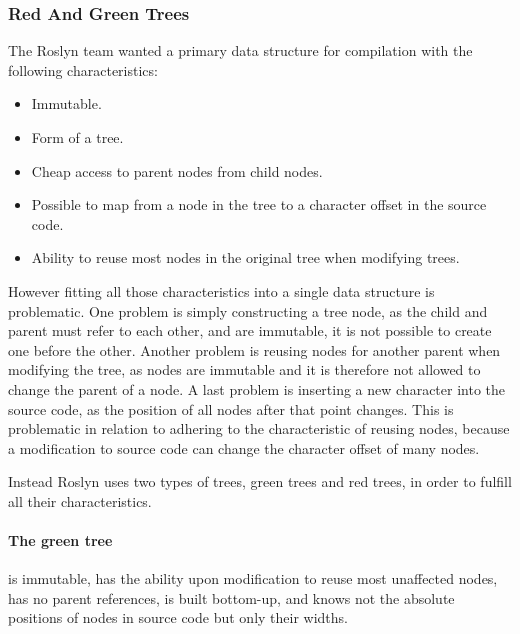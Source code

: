\subsubsection{Red And Green Trees}
The Roslyn team wanted a primary data structure for compilation with the following characteristics\cite{lippert2012redgreen}:
\begin{itemize}
	\item Immutable.
	\item Form of a tree.
	\item Cheap access to parent nodes from child nodes.
	\item Possible to map from a node in the tree to a character offset in the source code.
	\item Ability to reuse most nodes in the original tree when modifying trees.
\end{itemize}
However fitting all those characteristics into a single data structure is problematic\cite{lippert2012redgreen}. One problem is simply constructing a tree node, as the child and parent must refer to each other, and are immutable, it is not possible to create one before the other. Another problem is reusing nodes for another parent when modifying the tree, as nodes are immutable and it is therefore not allowed to change the parent of a node. A last problem is inserting a new character into the source code, as the position of all nodes after that point changes. This is problematic in relation to adhering to the characteristic of reusing nodes, because a modification to source code can change the character offset of many nodes.

Instead Roslyn uses two types of trees, green trees and red trees, in order to fulfill all their characteristics.

\paragraph{The green tree} is immutable, has the ability upon modification to reuse most unaffected nodes, has no parent references, is built bottom-up, and knows not the absolute positions of nodes in source code but only their widths\cite{lippert2012redgreen}.

